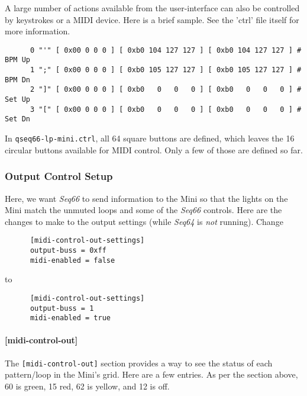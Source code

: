    A large number of actions available from the user-interface can also be
   controlled by keystrokes or a MIDI device.  Here is a brief sample.  See the
   'ctrl' file itself for more information.

   \begin{verbatim}
      0 "'" [ 0x00 0 0 0 ] [ 0xb0 104 127 127 ] [ 0xb0 104 127 127 ] # BPM Up
      1 ";" [ 0x00 0 0 0 ] [ 0xb0 105 127 127 ] [ 0xb0 105 127 127 ] # BPM Dn
      2 "]" [ 0x00 0 0 0 ] [ 0xb0   0   0   0 ] [ 0xb0   0   0   0 ] # Set Up
      3 "[" [ 0x00 0 0 0 ] [ 0xb0   0   0   0 ] [ 0xb0   0   0   0 ] # Set Dn
   \end{verbatim}

   In \texttt{qseq66-lp-mini.ctrl}, all 64 square buttons are defined, which
   leaves the 16 circular buttons available for MIDI control. Only a few of those
   are defined so far.

\subsubsection{Output Control Setup}
\label{subsubsec:launchpad_mini_output_control_setup}

   Here, we want \textsl{Seq66} to send information to the Mini
   so that the lights on the Mini match the unmuted loops and 
   some of the \textsl{Seq66} controls.  Here are the changes to make to the
   output settings (while \textsl{Seq64} is \textsl{not} running).
   Change

   \begin{verbatim}
      [midi-control-out-settings]
      output-buss = 0xff
      midi-enabled = false
   \end{verbatim}

   to

   \begin{verbatim}
      [midi-control-out-settings]
      output-buss = 1
      midi-enabled = true
   \end{verbatim}

\paragraph{[midi-control-out]}
\label{paragraph:patterns_midi_control_out}

   The \texttt{[midi-control-out]} section provides a way to see the status of
   each pattern/loop in the Mini's grid.  Here are a few entries. As per the
   section above, 60 is green, 15 red, 62 is yellow, and 12 is off.

